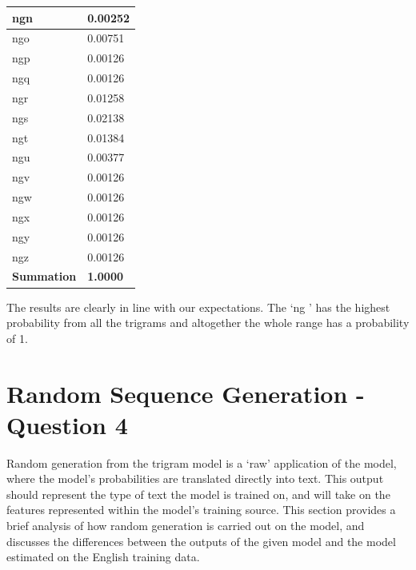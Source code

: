 \documentclass[12pt]{article}
\begin{document}
\begin{center}
\begin{longtable}{ | C{5em} | C{6.5em} | }
	
	\hline
	 ngn   &  0.00252\\
	\hline
	
	
	\hline
	 ngo   &  0.00751\\
	\hline
	
	
	\hline
	 ngp   &  0.00126\\
	\hline
	
	\hline
	 ngq   &  0.00126\\
	\hline
	
	\hline
	 ngr    & 0.01258\\
	\hline
	
	\hline
	 ngs   &  0.02138\\
	\hline
	
	\hline
	 ngt    & 0.01384\\
	\hline
	
	\hline
	 ngu    & 0.00377\\
	\hline
	
	
	\hline
	 ngv     & 0.00126\\
	\hline
	
	\hline
	 ngw    & 0.00126\\
	\hline
	
	
	\hline
	 ngx    & 0.00126\\
	\hline
	
	\hline
	 ngy    & 0.00126\\
	\hline
	
	\hline
	 ngz    & 0.00126\\
	\hline
	
	\hline
	 \textbf{Summation}   &  \textbf{1.0000}\\
	\hline
\end{longtable}
\end{center}
The results are clearly in line with our expectations.  The `ng ' has the highest probability from all the trigrams and altogether the whole range has a probability of 1.
\newpage
\section{Random Sequence Generation - Question 4}
Random generation from the trigram model is a `raw' application of the model, where the model's probabilities are translated directly into text.  This output should represent the type of text the model is trained on, and will  take on the features represented within the model's training source.  This section provides a brief analysis of how random generation is carried out on the model, and discusses the differences between the outputs of the given model and the model estimated on the English training data.
\end{document}
